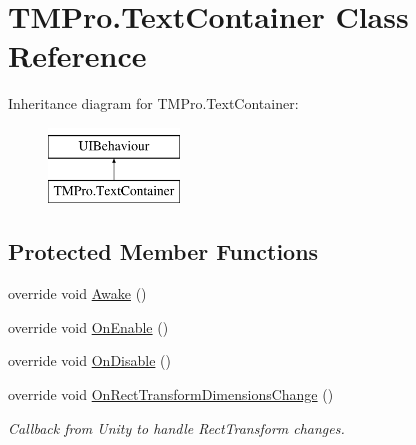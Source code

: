 \hypertarget{class_t_m_pro_1_1_text_container}{}\section{T\+M\+Pro.\+Text\+Container Class Reference}
\label{class_t_m_pro_1_1_text_container}
Inheritance diagram for T\+M\+Pro.\+Text\+Container\+:\begin{figure}[H]
\begin{center}
\leavevmode
\includegraphics[height=2.000000cm]{class_t_m_pro_1_1_text_container}
\end{center}
\end{figure}
\subsection*{Protected Member Functions}
\begin{DoxyCompactItemize}
\item 
override void \mbox{\hyperlink{class_t_m_pro_1_1_text_container_a6cac443954b176d57ec96cb3e2b79b92}{Awake}} ()
\item 
override void \mbox{\hyperlink{class_t_m_pro_1_1_text_container_a9781ce6d36e9f18c93171d29f8d0146c}{On\+Enable}} ()
\item 
override void \mbox{\hyperlink{class_t_m_pro_1_1_text_container_adbd08c1c446399e7336765eed64da59f}{On\+Disable}} ()
\item 
override void \mbox{\hyperlink{class_t_m_pro_1_1_text_container_a8bb1eabc8e3cfaf2fd2027fcd8f32696}{On\+Rect\+Transform\+Dimensions\+Change}} ()
\begin{DoxyCompactList}\small\item\em Callback from Unity to handle Rect\+Transform changes. \end{DoxyCompactList}\end{DoxyCompactItemize}
